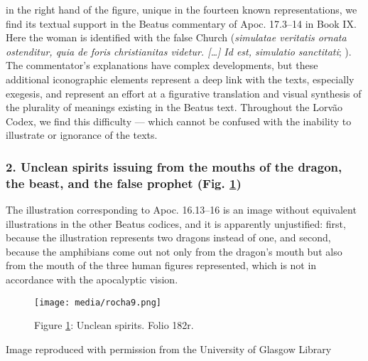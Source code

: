 \documentclass{article}
\begin{document}
in the right hand of the figure, unique in the fourteen known
representations, we find its textual support in the Beatus commentary of
Apoc. 17.3--14 in Book IX. Here the woman is identified with the false
Church (\emph{simulatae veritatis ornata ostenditur, quia de foris
christianitas videtur. [\ldots] Id est, simulatio sanctitati}; \citealt[566]{gonzalez_echegaray_obras_1995}). The commentator's explanations
have complex developments, but these additional iconographic elements
represent a deep link with the texts, especially exegesis, and represent
an effort at a figurative translation and visual synthesis of the
plurality of meanings existing in the Beatus text. Throughout the Lorvão
Codex, we find this difficulty –– which cannot be confused with the
inability to illustrate or ignorance of the texts.

\subsubsection{2. Unclean spirits issuing from the mouths of the dragon, the
beast, and the false prophet (Fig. \ref{fig:rocha:spirits})} The illustration corresponding
to Apoc. 16.13--16 is an image without equivalent illustrations in the
other Beatus codices, and it is apparently unjustified: first, because
the illustration represents two dragons instead of one, and second,
because the amphibians come out not only from the dragon's mouth but
also from the mouth of the three human figures represented, which is not
in accordance with the apocalyptic vision.

\begin{figure}[H]
    \centering
    \texttt{[image: media/rocha9.png]}
    \caption{Figure \ref{fig:rocha:spirits}: Unclean spirits. Folio 182r.}
    \label{fig:rocha:spirits}
\end{figure}


 Image reproduced with permission from the University of Glasgow Library 
\end{document}
